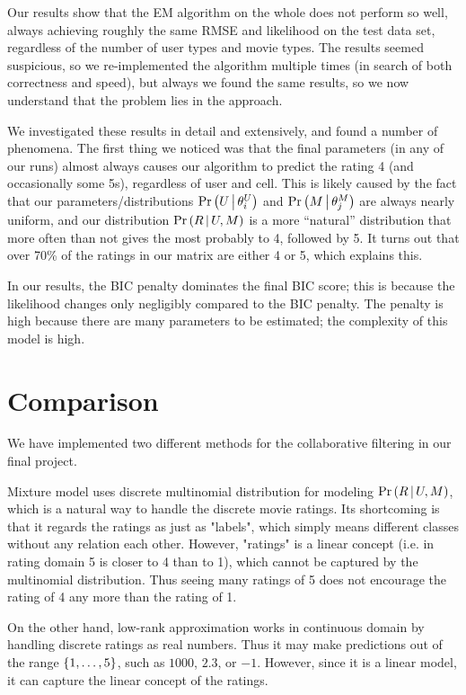 \documentclass{article}
\begin{document}
Our results show that the EM algorithm on the whole does not perform
so well, always achieving roughly the same RMSE and likelihood on the
test data set, regardless of the number of user types and movie types.
The results seemed suspicious, so we re-implemented the algorithm
multiple times (in search of both correctness and speed), but always
we found the same results, so we now understand that the problem lies
in the approach.

We investigated these results in detail and extensively, and
found a number of phenomena. The first thing we noticed was that the
final parameters (in any of our runs) almost always causes our
algorithm to predict the rating 4 (and occasionally some 5s),
regardless of user and cell. This is likely caused by the fact that
our parameters/distributions ${{\Pr \left(  U \,\middle|\, \theta^U_i  \right)}}$ and
${{\Pr \left(  M \,\middle|\, \theta^M_j  \right)}}$ are always nearly uniform, and our distribution
${{\Pr \left(  R \,\middle|\, U,M  \right)}}$ is a more ``natural'' distribution that more often than
not gives the most probably to 4, followed by 5. It turns out that
over 70\% of the ratings in our matrix are either 4 or 5, which
explains this.

In our results, the BIC penalty dominates the final BIC score; this is
because the likelihood changes only negligibly compared to the BIC
penalty. The penalty is high because there are many parameters to be
estimated; the complexity of this model is high.



\section{Comparison}
\label{sec:comparison}
We have implemented two different methods for the collaborative filtering in our final project. 

Mixture model uses discrete multinomial distribution for modeling ${{\Pr \left(  R \,\middle|\, U,M  \right)}}$, which is a natural way to handle the discrete movie ratings. Its shortcoming is that it regards the ratings as just as "labels", which simply means different classes without any relation each other. However, "ratings" is a linear concept (i.e. in rating domain 5 is closer to 4 than to 1), which cannot be captured by the multinomial distribution. Thus seeing many ratings of 5 does not encourage the rating of 4 any more than the rating of 1.

On the other hand, low-rank approximation works in continuous domain by handling discrete ratings as real numbers. Thus it may make predictions out of the range ${\left\{ 1, \dots, 5 \right\}}$, such as $1000$, $2.3$, or $-1$. However, since it is a linear model, it can capture the linear concept of the ratings.  
\end{document}
